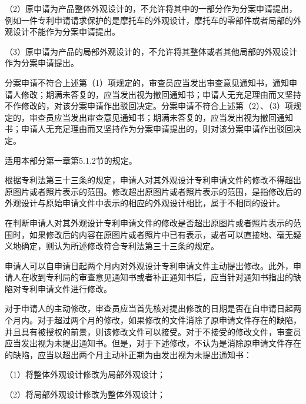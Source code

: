 {\setlength{\parindent}{17.1bp}（2）原申请为产品整体外观设计的，不允许将其中的一部分作为分案申请提出，例如一件专利申请请求保护的是摩托车的外观设计，摩托车的零部件或者局部的外观设计不能作为分案申请提出。\par}

{\setlength{\parindent}{17.1bp}（3）原申请为产品的局部外观设计的，不允许将其整体或者其他局部的外观设计作为分案申请提出。\par}

分案申请不符合上述第（1）项规定的，审查员应当发出审查意见通知书，通知申请人修改；期满未答复的，应当发出视为撤回通知书；申请人无充足理由而又坚持不作修改的，对该分案申请作出驳回决定。分案申请不符合上述第（2）、（3）项规定的，审查员应当发出审查意见通知书；期满未答复的，应当发出视为撤回通知书；申请人无充足理由而又坚持作为分案申请提出的，则对该分案申请作出驳回决定。

适用本部分第一章第5.1.2节的规定。

根据专利法第三十三条的规定，申请人对其外观设计专利申请文件的修改不得超出原图片或者照片表示的范围。修改超出原图片或者照片表示的范围，是指修改后的外观设计与原始申请文件中表示的相应的外观设计相比，属于不相同的设计。

在判断申请人对其外观设计专利申请文件的修改是否超出原图片或者照片表示的范围时，如果修改后的内容在原图片或者照片中已有表示，或者可以直接地、毫无疑义地确定，则认为所述修改符合专利法第三十三条的规定。

申请人可以自申请日起两个月内对外观设计专利申请文件主动提出修改。此外，申请人在收到专利局的审查意见通知书或者补正通知书后，应当针对通知书指出的缺陷对专利申请文件进行修改。

对于申请人的主动修改，审查员应当首先核对提出修改的日期是否在自申请日起两个月内。对于超过两个月的修改，如果修改的文件消除了原申请文件存在的缺陷，并且具有被授权的前景，则该修改文件可以接受。对于不接受的修改文件，审查员应当发出视为未提出通知书。但是，对于下述修改，不认为是消除原申请文件存在的缺陷，应当以超出两个月主动补正期为由发出视为未提出通知书：

{\setlength{\parindent}{17.1bp}（1）将整体外观设计修改为局部外观设计；\par}

{\setlength{\parindent}{17.1bp}（2）将局部外观设计修改为整体外观设计；\par}

